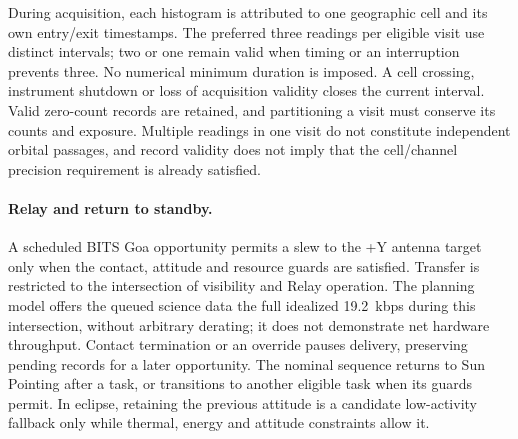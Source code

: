 During acquisition, each histogram is attributed to one geographic cell and its own entry/exit timestamps. The preferred three readings per eligible visit use distinct intervals; two or one remain valid when timing or an interruption prevents three. No numerical minimum duration is imposed. A cell crossing, instrument shutdown or loss of acquisition validity closes the current interval. Valid zero-count records are retained, and partitioning a visit must conserve its counts and exposure. Multiple readings in one visit do not constitute independent orbital passages, and record validity does not imply that the cell/channel precision requirement is already satisfied.

\paragraph{Relay and return to standby.}
A scheduled BITS Goa opportunity permits a slew to the +Y antenna target only when the contact, attitude and resource guards are satisfied. Transfer is restricted to the intersection of visibility and Relay operation. The planning model offers the queued science data the full idealized 19.2~kbps during this intersection, without arbitrary derating; it does not demonstrate net hardware throughput. Contact termination or an override pauses delivery, preserving pending records for a later opportunity. The nominal sequence returns to Sun Pointing after a task, or transitions to another eligible task when its guards permit. In eclipse, retaining the previous attitude is a candidate low-activity fallback only while thermal, energy and attitude constraints allow it.

